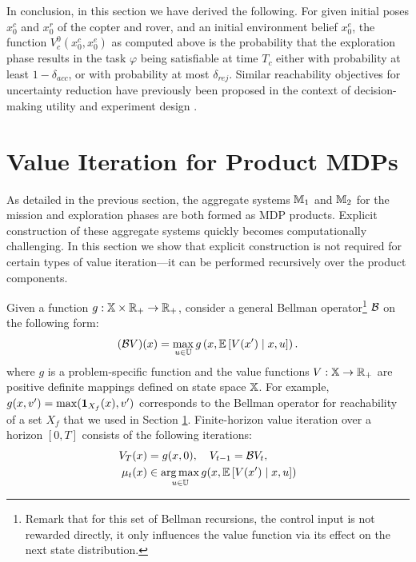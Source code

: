 \documentclass[conference]{IEEEtran}
\renewcommand{\cite}[1]{\citep{#1}}
\newcommand{\sofieNew}[1]{{\color{blue}#1}}
\begin{document}
In conclusion, in this section we have derived the following. For given initial poses $x^c_0$ and $x^r_0$ of the copter and rover, and an initial environment belief $x^e_0$, the function $V^0_c(x^c_0, x^e_0)$ as computed above is the probability that the exploration phase results in the task $\varphi$ being satisfiable at time $T_c$ either with probability at least $1- \delta_{acc}$, or with probability at most $\delta_{rej}$. Similar reachability objectives for uncertainty reduction have previously been proposed in the context of decision-making utility \cite{lindley2000philosophy} and experiment design \cite{haesaert2016experiment}.


\section{ Value Iteration for Product MDPs}
\label{sec:valueiter}

As detailed in the previous section, the aggregate systems $\mathbb{M}_1$ and $\mathbb{M}_2$ for the mission and exploration phases are both formed as MDP products. Explicit construction of these aggregate systems quickly becomes computationally challenging. In this section we show that explicit construction is not required for certain types of value iteration---it can be performed recursively over the product components.

Given a function $g: \mathbb{X} \times \mathbb{R}_+ \rightarrow \mathbb{R}_+$, consider a general Bellman operator\footnote{\sofieNew{Remark that for this set of Bellman recursions, the control input is not rewarded directly, it only influences the value function via its effect on the next state distribution.}} $\mathcal{B}$ on the following form:
\begin{equation}
(\mathcal{B} V) (x) =  \max_{u \in \mathbb{U}} g \left( x, \mathbb E \left[  V(x') \mid x,u \right] \right).
\end{equation}
where $g$ is a problem-specific function and the value functions $V:\mathbb{X}\rightarrow \mathbb{R}_+$ are positive definite mappings defined on state space $\mathbb{X}$. For example, $g(x, v') = \max(\mathbf{1}_{X_f}(x), v')$ corresponds to the Bellman operator for reachability of a set $X_f$ that we used in Section \ref{sec:valueiter}. Finite-horizon value iteration over a horizon $[0, T]$ consists of the following iterations:
\begin{equation}
\begin{aligned}
	V_T(x) & = g(x, 0), \quad V_{t-1} = \mathcal{B} V_t,\\
	\mu_t(x) & \in \operatorname*{arg\,max}_{u \in \mathbb{U}} g(x, \mathbb{E}\left[ V(x') \mid x,u \right])
\end{aligned}
\end{equation}
\end{document}
